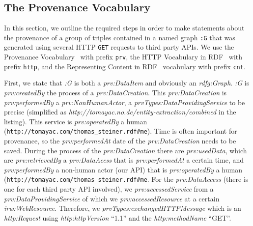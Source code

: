 \documentclass[twocolumn]{article}
\begin{document}
\subsection{The Provenance Vocabulary}                                      \label{sec:provenance}
In this section, we outline the required steps in order to make statements about the provenance of a group of triples contained in a named graph \texttt{:G} that was generated using several HTTP \texttt{GET} requests to third party APIs. We use the Provenance Vocabulary~\cite{Hartig:Provenance} with prefix \texttt{prv}, the HTTP Vocabulary in RDF~\cite{HTTP:RDF} with prefix \texttt{http}, and the Representing Content in RDF~\cite{CNT:RDF} vocabulary with prefix \texttt{cnt}.

First, we state that \emph{:G} is both a \emph{prv:DataItem} and obviously an \emph{rdfg:Graph}. \emph{:G} is \emph{prv:createdBy} the process of a \emph{prv:DataCreation}. This \emph{prv:DataCreation} is \emph{prv:performedBy} a \emph{prv:NonHumanActor}, a \emph{prvTypes:DataProvidingService} to be precise (simplified as \emph{http://tomayac.no.de/entity-extraction/combined} in the listing). This service is \emph{prv:operatedBy} a human (\texttt{http://tomayac.com/thomas\_steiner.rdf\#me}). Time is often important for provenance, so the \emph{prv:performedAt} date of the \emph{prv:DataCreation} needs to be saved. During the process of the \emph{prv:DataCreation} there are \emph{prv:usedData}, which are \emph{prv:retrievedBy} a \emph{prv:DataAcess} that is \emph{prv:performedAt} a certain time, and \emph{prv:performedBy} a non-human actor (our API) that is \emph{prv:operatedBy} a human (\texttt{http://tomayac.com/thomas\_steiner.rdf\#me}. For the \emph{prv:DataAccess} (there is one for each third party API involved), we \emph{prv:accessedService} from a \emph{prv:DataProvidingService} of which we \emph{prv:accessedResource} at a certain \emph{irw:WebResource}. Therefore, we \emph{prvTypes:exchangedHTTPMessage} which is an \emph{http:Request} using \emph{http:httpVersion} ``1.1'' and the \emph{http:methodName} ``GET''.
\end{document}
